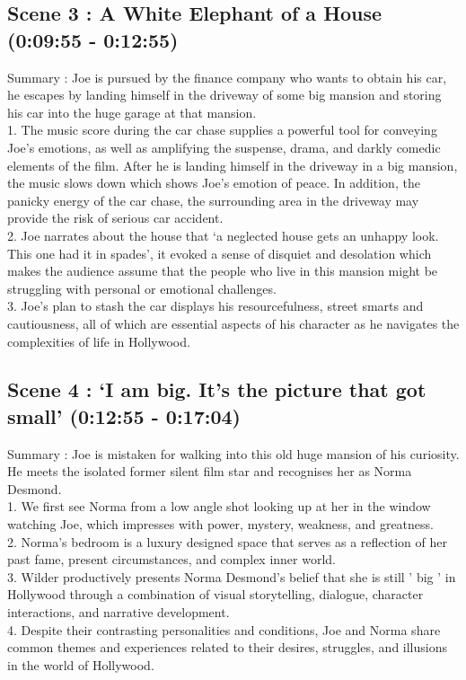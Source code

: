 \documentclass[a4paper]{article}
\begin{document}
\subsection{Scene 3 : A White Elephant of a House (0:09:55 - 0:12:55)}
Summary : Joe is pursued by the finance company who wants to obtain his car, he escapes
by landing himself in the driveway of some big mansion and storing his car into the huge
garage at that mansion.\\
1. The music score during the car chase supplies a powerful tool for conveying Joe's
emotions, as well as amplifying the suspense, drama, and darkly comedic elements
of the film. After he is landing himself in the driveway in a big mansion, the music
slows down which shows Joe’s emotion of peace. In addition, the panicky energy of
the car chase, the surrounding area in the driveway may provide the risk of serious
car accident.\\
2. Joe narrates about the house that ‘a neglected house gets an unhappy look. This
one had it in spades’, it evoked a sense of disquiet and desolation which makes the
audience assume that the people who live in this mansion might be struggling with
personal or emotional challenges.\\
3. Joe's plan to stash the car displays his resourcefulness, street smarts and
cautiousness, all of which are essential aspects of his character as he navigates the
complexities of life in Hollywood.\\

\subsection{Scene 4 : ‘I am big. It’s the picture that got small’ (0:12:55 - 0:17:04)}
Summary : Joe is mistaken for walking into this old huge mansion of his curiosity. He meets
the isolated former silent film star and recognises her as Norma Desmond.\\
1. We first see Norma from a low angle shot looking up at her in the window watching
Joe, which impresses with power, mystery, weakness, and greatness.\\
2. Norma's bedroom is a luxury designed space that serves as a reflection of her past
fame, present circumstances, and complex inner world.\\
3. Wilder productively presents Norma Desmond's belief that she is still ' big ' in
Hollywood through a combination of visual storytelling, dialogue, character
interactions, and narrative development.\\
4. Despite their contrasting personalities and conditions, Joe and Norma share common
themes and experiences related to their desires, struggles, and illusions in the world
of Hollywood.\\
\end{document}
